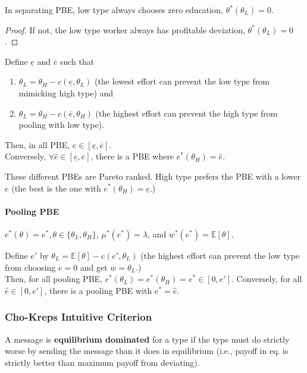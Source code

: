 \documentclass[11pt]{elegantbook}
\begin{document}
\begin{lemma}
    In separating PBE, low type always chooses zero education, $\theta^*(\theta_L)=0$.
\end{lemma}
\begin{proof}
    If not, the low type worker always has profitable deviation, $\theta^*(\theta_L)=0$.
\end{proof}

\begin{lemma}
    Define $\underline{e}$ and $\overline{e}$ such that
    \begin{enumerate}
        \item $\theta_L=\theta_H-c(\underline{e},\theta_L)$ (the lowest effort can prevent the low type from mimicking high type) and
        \item $\theta_L=\theta_H-c(\overline{e},\theta_H)$ (the highest effort can prevent the high type from pooling with low type).
    \end{enumerate}
    Then, in all PBE, $e\in \left[\underline{e},\overline{e}\right]$.\\
    Conversely, $\forall \hat{e}\in \left[\underline{e},\overline{e}\right]$, there is a PBE where $e^*(\theta_H)=\hat{e}$.
\end{lemma}
These different PBEs are Pareto ranked. High type prefers the PBE with a lower $e$ (the best is the one with $e^*(\theta_H)=\underline{e}$.)

\paragraph*{Pooling PBE}
$e^*(\theta)=e^*,\theta\in\{\theta_L,\theta_H\}$, $\mu^*(e^*)=\lambda$, and $w^*(e^*)=\mathbb{E}[\theta]$.

\begin{lemma}
    Define $e'$ by $\theta_L=\mathbb{E}[\theta]-c(e',\theta_L)$ (the highest effort can prevent the low type from choosing $e=0$ and get $w=\theta_L$.)\\
    Then, for all pooling PBE, $e^*(\theta_L)=e^*(\theta_H)=e^*\in[0,e']$. Conversely, for all $\hat{e}\in [0,e']$, there is a pooling PBE with $e^*=\hat{e}$.
\end{lemma}


\subsubsection{Cho-Kreps Intuitive Criterion}
\begin{definition}
    \normalfont
    A message is \textbf{equilibrium dominated} for a type if the type must do strictly worse by sending the message than it does in equilibrium (i.e., payoff in eq. is strictly better than maximum payoff from deviating).
\end{definition}
\end{document}
